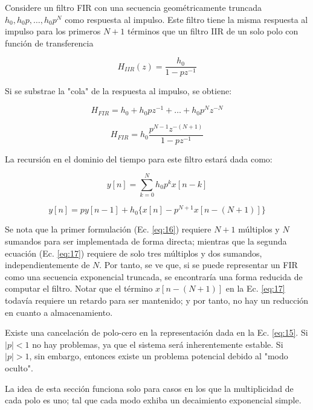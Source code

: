 \documentclass[conference]{IEEEtran}
\begin{document}
Considere un filtro FIR con una secuencia geométricamente truncada \(h_0,h_0p,\ldots , h_0 p^N\) como respuesta al impulso. Este filtro tiene la misma respuesta al impulso para los primeros \(N+1\) términos que un filtro IIR de un solo polo con función de transferencia

\begin{equation}
    H_{IIR}(z) = \frac{h_0}{1- p z^{-1}}
\end{equation}

Si se substrae la "cola" de la respuesta al impulso, se obtiene:

\begin{equation}
    H_{FIR} = h_0 + h_0 p z^{-1} + \ldots + h_0 p^N z^{-N}
\end{equation}

\begin{equation}
    H_{FIR} = h_0 \frac{p^{N-1} z^{-(N+1)}}{1 - p z^{-1}}
    \label{eq:15}
\end{equation}

La recursión en el dominio del tiempo para este filtro estará dada como:

\begin{equation}
    y[n] = \sum_{k=0}^{N}{h_0 p^k x[n-k]}
    \label{eq:16}
\end{equation}

\begin{equation}
   y[n] = p y[n-1] + h_0 \{x[n] - p^{N+1} x[n - (N+1)]\}
   \label{eq:17}
\end{equation}

Se nota que la primer formulación (Ec. \ref{eq:16}) requiere \(N+1\) múltiplos y \(N\) sumandos para ser implementada de forma directa; mientras que la segunda ecuación (Ec. \ref{eq:17}) requiere de solo tres múltiplos y dos sumandos, independientemente de \(N\). Por tanto, se ve que, si se puede representar un FIR como una secuencia exponencial truncada, se encontraría una forma reducida de computar el filtro. Notar que el término \(x[n - (N+1)]\) en la Ec. \ref{eq:17} todavía requiere un retardo para ser mantenido; y por tanto, no hay un reducción en cuanto a almacenamiento.

Existe una cancelación de polo-cero en la representación dada en la Ec. \ref{eq:15}. Si \(|p|<1\) no hay problemas, ya que el sistema será inherentemente estable. Si \(|p|>1\), sin embargo, entonces existe un problema potencial debido al "modo oculto".

La idea de esta sección funciona solo para casos en los que la multiplicidad de cada polo es uno; tal que cada modo exhiba un decaimiento exponencial simple.
\end{document}
